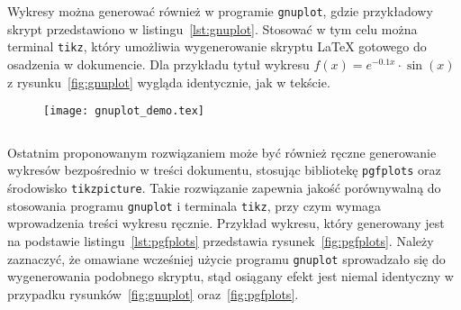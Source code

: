 Wykresy można generować również w programie \texttt{gnuplot}, gdzie przykładowy skrypt przedstawiono w listingu~\ref{lst:gnuplot}. Stosować w tym celu można terminal \texttt{tikz}, który umożliwia wygenerowanie skryptu \LaTeX{} gotowego do osadzenia w dokumencie. Dla przykładu tytuł wykresu $f(x) = e^{-0.1x} \cdot \sin(x)$ z rysunku~\ref{fig:gnuplot} wygląda identycznie, jak w tekście.

\begin{figure}[htb!]
\centering
\texttt{[image: gnuplot\_demo.tex]}
\end{figure}

\begin{listing}[hbt!]
\inputminted[linenos, breaklines]{gnuplot}{skrypty/plot_demo.gnuplot}
\end{listing}

Ostatnim proponowanym rozwiązaniem może być również ręczne generowanie wykresów bezpośrednio w treści dokumentu, stosując bibliotekę \texttt{pgfplots} oraz środowisko \texttt{tikzpicture}. Takie rozwiązanie zapewnia jakość porównywalną do stosowania programu \texttt{gnuplot} i terminala \texttt{tikz}, przy czym wymaga wprowadzenia treści wykresu ręcznie. Przykład wykresu, który generowany jest na podstawie listingu~\ref{lst:pgfplots} przedstawia rysunek~\ref{fig:pgfplots}. Należy zaznaczyć, że omawiane wcześniej użycie programu \texttt{gnuplot} sprowadzało się do wygenerowania podobnego skryptu, stąd osiągany efekt jest niemal identyczny w przypadku rysunków~\ref{fig:gnuplot} oraz~\ref{fig:pgfplots}.

\begin{figure}[htb!]
\centering
{}
\end{figure}

